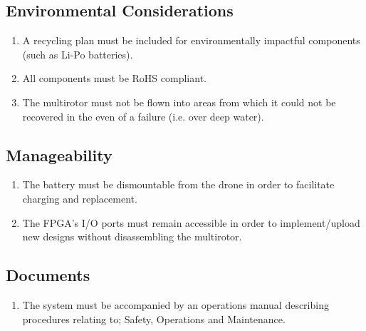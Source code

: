 \documentclass[10pt,letterpaper]{article}
\begin{document}
\subsection{Environmental Considerations}
\begin{enumerate}[label=C.EN.\arabic*, wide=1cm, widest=3cm, leftmargin=*, font=\bfseries, noitemsep,topsep=0pt, parsep=4pt, partopsep=0pt]
    \item A recycling plan must be included for environmentally impactful components (such as Li-Po batteries).
    \item All components must be RoHS compliant.
    \item The multirotor must not be flown into areas from which it could not be recovered in the even of a failure (i.e. over deep water).
\end{enumerate}

\subsection{Manageability}
\begin{enumerate}[label=C.MG.\arabic*, wide=1cm, widest=3cm, leftmargin=*, font=\bfseries, noitemsep,topsep=0pt, parsep=4pt, partopsep=0pt]
    \item The battery must be dismountable from the drone in order to facilitate charging and replacement.
    \item The FPGA's I/O ports must remain accessible in order to implement/upload new designs without disassembling the multirotor.
\end{enumerate}

\subsection{Documents}
\begin{enumerate}[label=C.DD.\arabic*, wide=1cm, widest=3cm, leftmargin=*, font=\bfseries, noitemsep,topsep=0pt, parsep=4pt, partopsep=0pt]
    \item  The system must be accompanied by an operations manual describing procedures relating to; Safety, Operations and Maintenance.
\end{enumerate}

\clearpage
{}



\end{document}
